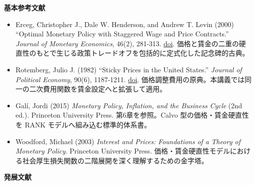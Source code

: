 \documentclass[
  japanese,
  lualatex,
  ja=standard,
  12pt,
  a4paper]{ltjsarticle}
\providecommand{\tightlist}{%
  \setlength{\itemsep}{0pt}\setlength{\parskip}{0pt}}
\begin{document}
\textbf{基本参考文献}

\begin{itemize}
\tightlist
\item
  Erceg, Christopher J., Dale W. Henderson, and Andrew T. Levin (2000)
  ``Optimal Monetary Policy with Staggered Wage and Price Contracts.''
  \emph{Journal of Monetary Economics}, 46(2), 281-313.
  \href{https://doi.org/10.1016/S0304-3932(00)00028-3}{doi}.
  価格と賃金の二重の硬直性のもとで生じる政策トレードオフを包括的に定式化した記念碑的古典。
\item
  Rotemberg, Julio J. (1982) ``Sticky Prices in the United States.''
  \emph{Journal of Political Economy}, 90(6), 1187-1211.
  \href{https://doi.org/10.1086/261117}{doi}.
  価格調整費用の原典。本講義では同一の二次費用関数を賃金設定へと拡張して適用。
\item
  Galí, Jordi (2015) \emph{Monetary Policy, Inflation, and the Business
  Cycle} (2nd ed.). Princeton University Press. 第6章を参照。Calvo
  型の価格・賃金硬直性を RANK モデルへ組み込む標準的体系書。
\item
  Woodford, Michael (2003) \emph{Interest and Prices: Foundations of a
  Theory of Monetary Policy}. Princeton University Press.
  価格・賃金硬直性モデルにおける社会厚生損失関数の二階展開を深く理解するための金字塔。
\end{itemize}

\newpage

\textbf{発展文献}
\end{document}
